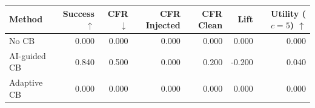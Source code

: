 \begin{tabular}{lrrrrrr}
\toprule
Method & Success $\uparrow$ & CFR $\downarrow$ & CFR Injected & CFR Clean & Lift & Utility ($c=5$) $\uparrow$ \\
\midrule
No CB & 0.000 & 0.000 & 0.000 & 0.000 & 0.000 & 0.000 \\
AI-guided CB & 0.840 & 0.500 & 0.000 & 0.200 & -0.200 & 0.040 \\
Adaptive CB & 0.000 & 0.000 & 0.000 & 0.000 & 0.000 & 0.000 \\
\bottomrule
\end{tabular}
